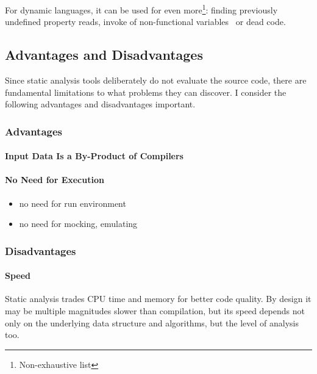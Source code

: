 For dynamic languages, it can be used for even more\footnote{Non-exhaustive list}: finding previously undefined property reads, invoke of non-functional variables~\cite{jensen_type_2009} or dead code.

\subsection{Advantages and Disadvantages}

Since static analysis tools deliberately do not evaluate the source code, there are fundamental limitations to what problems they can discover. I consider the following advantages and disadvantages important.


\subsubsection{Advantages}
\paragraph{Input Data Is a By-Product of Compilers}

\paragraph{No Need for Execution}
\begin{itemize}
  \item no need for run environment
  \item no need for mocking, emulating
\end{itemize}

\subsubsection{Disadvantages}
\paragraph{Speed} Static analysis trades CPU time and memory for better code quality. By design it may be multiple magnitudes slower than compilation, but its speed depends not only on the underlying data structure and algorithms, but the level of analysis too.
%
%

